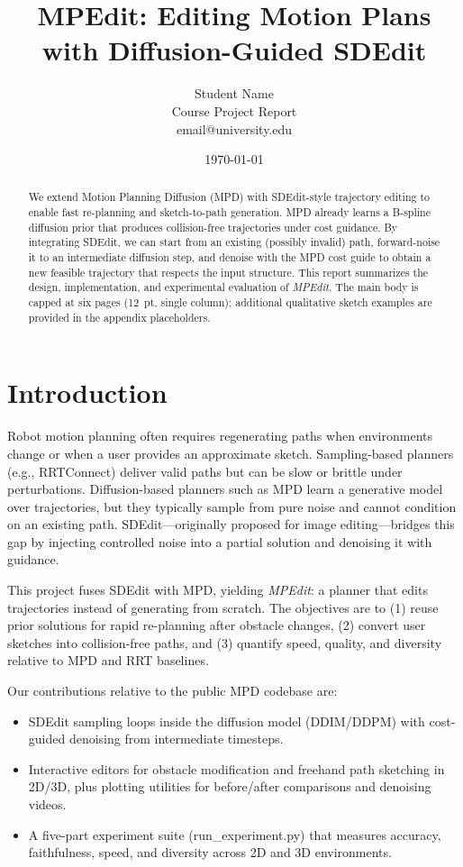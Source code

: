 \documentclass[12pt]{article}
\title{\textbf{MPEdit: Editing Motion Plans with Diffusion-Guided SDEdit}}
\author{Student Name \\ Course Project Report \\ email@university.edu}
\date{\today}
\begin{document}
\maketitle

\begin{abstract}
We extend Motion Planning Diffusion (MPD) with SDEdit-style trajectory editing to enable fast re-planning and sketch-to-path generation. MPD already learns a B-spline diffusion prior that produces collision-free trajectories under cost guidance. By integrating SDEdit, we can start from an existing (possibly invalid) path, forward-noise it to an intermediate diffusion step, and denoise with the MPD cost guide to obtain a new feasible trajectory that respects the input structure. This report summarizes the design, implementation, and experimental evaluation of \emph{MPEdit}. The main body is capped at six pages (12~pt, single column); additional qualitative sketch examples are provided in the appendix placeholders.
\end{abstract}

\section{Introduction}
Robot motion planning often requires regenerating paths when environments change or when a user provides an approximate sketch. Sampling-based planners (e.g., RRTConnect) deliver valid paths but can be slow or brittle under perturbations. Diffusion-based planners such as MPD learn a generative model over trajectories, but they typically sample from pure noise and cannot condition on an existing path. SDEdit---originally proposed for image editing---bridges this gap by injecting controlled noise into a partial solution and denoising it with guidance.

This project fuses SDEdit with MPD, yielding \emph{MPEdit}: a planner that edits trajectories instead of generating from scratch. The objectives are to (1) reuse prior solutions for rapid re-planning after obstacle changes, (2) convert user sketches into collision-free paths, and (3) quantify speed, quality, and diversity relative to MPD and RRT baselines.

Our contributions relative to the public MPD codebase are:
\begin{itemize}[leftmargin=*]
  \item SDEdit sampling loops inside the diffusion model (DDIM/DDPM) with cost-guided denoising from intermediate timesteps.
  \item Interactive editors for obstacle modification and freehand path sketching in 2D/3D, plus plotting utilities for before/after comparisons and denoising videos.
  \item A five-part experiment suite (run\_experiment.py) that measures accuracy, faithfulness, speed, and diversity across 2D and 3D environments.
\end{itemize}
\end{document}
